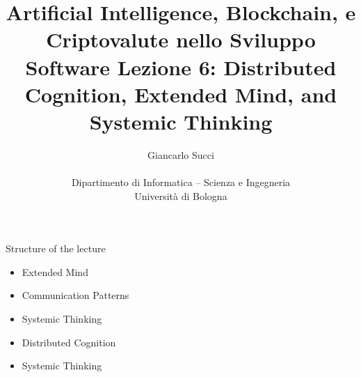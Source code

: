 \documentclass{beamer}
\title[L04]{Artificial Intelligence, Blockchain, e Criptovalute nello Sviluppo Software \newline\newline
Lezione 6: Distributed Cognition, Extended Mind, and Systemic Thinking} %
\author[{\tiny Giancarlo Succi }]{Giancarlo Succi\\\\ Dipartimento di Informatica -- Scienza e Ingegneria\\Universit\`{a} di Bologna\\
\bftt{g.succi@unibo.it}
} %
\institute[unibo] %
\date{} %
\begin{document}
\begin{frame}
\titlepage %

\end{frame}





\begin{frame}
{\centerline{Structure of the lecture}}
\begin{itemize}
    \item Extended Mind
    \item Communication Patterns
    \item Systemic Thinking
    \item Distributed Cognition
    \item Systemic Thinking
    \end{itemize}
\end{frame}
\end{document}
